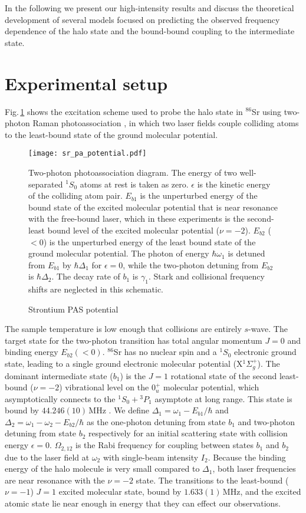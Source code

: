 In the following we present our high-intensity results and discuss the theoretical development of several models focused on predicting the observed frequency dependence of the halo state and the bound-bound coupling to the intermediate state.

\section{Experimental setup} \label{sec:highE_methods}
Fig.\,\ref{fig:PASDiagram} shows the excitation scheme used to probe the halo state in $^{86}$Sr using two-photon Raman photoassociation \cite{jtl06}, in which two laser fields couple colliding atoms to the least-bound state of the ground molecular potential. 
	\begin{figure} 
	\centerline{
	  \texttt{[image: sr\_pa\_potential.pdf]}}
	  \caption{Strontium PAS potential}{Two-photon photoassociation diagram. The energy of two well-separated $^1S_0$ atoms at rest is taken as zero. $\epsilon$ is the kinetic energy of the colliding atom pair. $E_{b1}$ is the unperturbed energy of the bound state of the excited molecular potential that is near resonance with the free-bound laser, which in these experiments is the second-least bound level of the excited molecular potential ($\nu=-2$). $E_{b2}$ ($<0$) is the unperturbed energy of the least bound state of the ground molecular potential. The photon of energy $\hbar \omega_1$ is detuned from $E_{b1}$ by $\hbar \Delta_1$ for $\epsilon=0$, while the two-photon detuning from $E_{b2}$ is $\hbar \Delta_2$. The decay rate of $b_1$ is $\gamma_1$. Stark and collisional frequency shifts are neglected in this schematic.}
	  \label{fig:PASDiagram}
	\end{figure}
The sample temperature is low enough that collisions are entirely $s$-wave. 
The target state for the two-photon transition has total angular momentum $J=0$ and binding energy $E_{b2}(<0)$. $^{86}$Sr has no nuclear spin and a $^1S_0$ electronic ground state, leading to a single ground electronic molecular potential (X$^1\Sigma_g^+$). 
The dominant intermediate state ($b_1$) is the $J=1$ rotational state of the second least-bound ($\nu=-2$) vibrational level on the $0^+_u$ molecular potential, which asymptotically connects to the $^1S_0+ {^3P_1}$ asymptote at long range\cite{mmp08}.
This state is bound by $44.246(10)$\,MHz \cite{bmc14}.
We define $\Delta_1=\omega_1-E_{b1}/\hbar$ and $\Delta_2=\omega_1-\omega_2-E_{b2}/\hbar$ as the one-photon detuning from state $b_1$ and two-photon detuning from state $b_2$ respectively for an initial scattering state with collision energy $\epsilon=0$.
$\Omega_{2,12}$ is the Rabi frequency for coupling between states $b_1$ and $b_2$ due to the laser field at $\omega_2$ with single-beam intensity $I_2$.
Because the binding energy of the halo molecule is very small compared to $\Delta_1$, both laser frequencies are near resonance with the $\nu=-2$ state. 
The transitions to the least-bound ($\nu=-1$) $J=1$ excited molecular state, bound by $1.633(1)$\,MHz, and the excited atomic state lie near enough in energy that they can effect our observations.	

